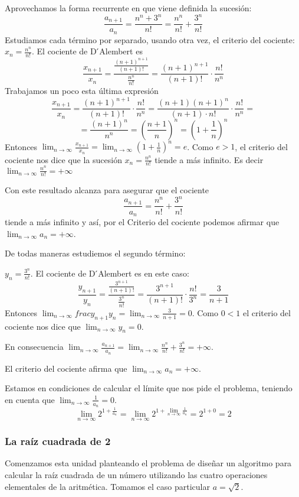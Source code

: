 \documentclass[../teoria.root.tex]{subfiles}
\begin{document}
Aprovechamos la forma recurrente en que viene definida la sucesión:
\[\frac{a_{n+1}}{a_n}=\frac{n^n+3^n}{n!}=\frac{n^n}{n!}+\frac{3^n}{n!}\]
Estudiamos cada término por separado, usando otra vez, el criterio del cociente:
\(x_n=\frac{n^n}{n!}\).
El cociente de D ́Alembert es
\[\frac{x_{n+1}}{x_n}=\frac{\frac{(n+1)^{n+1}}{(n+1)!}}{\frac{n^n}{n!}}=\frac{(n+1)^{n+1}}{(n+1)!}\cdot\frac{n!}{n^n}\]
Trabajamos un poco esta última expresión
\[\frac{x_{n+1}}{x_n}=\frac{(n+1)^{n+1}}{(n+1)!}\cdot\frac{n!}{n^n}=\frac{(n+1)(n+1)^n}{(n+1)\cdot n!}\cdot\frac{n!}{n^n}=\]
\[=\frac{(n+1)^n}{n^n}=\left(\frac{n+1}{n}\right)^n=\left(1+\frac{1}{n}\right)^n\]
Entonces \(\lim_{n\to\infty}\frac{x_{n+1}}{x_n}=\lim_{n\to\infty}\left(1+\frac{1}{n}\right)^n=e\).
Como \(e>1\), el criterio del cociente nos dice que la sucesión \(x_n=\frac{n^n}{n!}\) tiende a más infinito.
Es decir \(\lim_{n\to\infty}\frac{n^n}{n!}=+\infty\)

Con este resultado alcanza para asegurar que el cociente
\[\frac{a_{n+1}}{a_n}=\frac{n^n}{n!}+\frac{3^n}{n!}\]
tiende a más infinito y así, por el Criterio del cociente podemos afirmar que \(\lim_{n\to\infty}a_n=+\infty\).

De todas maneras estudiemos el segundo término:

\(y_n=\frac{3^n}{n!}\).
El cociente de D ́Alembert es en este caso:
\[\frac{y_{n+1}}{y_n}=\frac{\frac{3^{n+1}}{(n+1)!}}{\frac{3^n}{n!}}=\frac{3^{n+1}}{(n+1)!}\cdot\frac{n!}{3^n}=\frac{3}{n+1}\]
Entonces \(\lim_{n\to\infty}frac{y_{n+1}}{y_n}=\lim_{n\to\infty}\frac{3}{n+1}=0\).
Como \(0<1\) el criterio del cociente nos dice que \(\lim_{n\to\infty}y_n=0\).

En consecuencia \(\lim_{n\to\infty}\frac{a_{n+1}}{a_n}=\lim_{n\to\infty}\frac{n^n}{n!}+\frac{3^n}{n!}=+\infty\).

El criterio del cociente afirma que \(\lim_{n\to\infty}a_n=+\infty\).

Estamos en condiciones de calcular el límite que nos pide el problema, teniendo en cuenta que \(\lim_{n\to\infty}\frac{1}{a_n}=0\).
\[\lim_{n\to\infty}2^{1+\frac{1}{a_n}}=\lim_{n\to\infty}2^{1+\lim_{n\to\infty}\frac{1}{a_n}}=2^{1+0}=2\]
\subsubsection{La raíz cuadrada de 2}
Comenzamos esta unidad planteando el problema de diseñar un algoritmo para calcular la raíz cuadrada de un número utilizando las cuatro operaciones elementales de la aritmética.
Tomamos el caso particular \(a=\sqrt{2}\).
\end{document}
